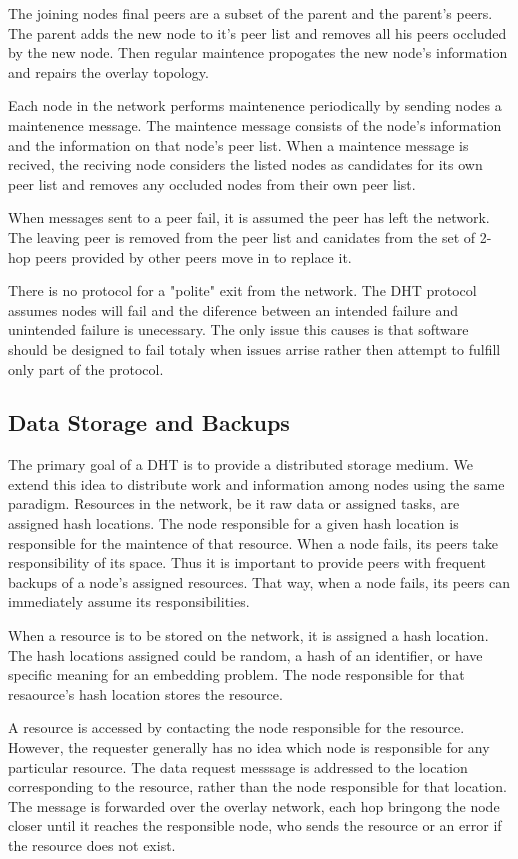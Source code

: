 \documentclass[11pt]{IEEEtran} %
\begin{document}
The joining nodes final peers are a subset of the parent and the parent's peers. The parent adds the new node to it's peer list and removes all his peers occluded by the new node.  Then regular maintence propogates the new node's information and repairs the overlay topology.

Each node in the network performs maintenence periodically by sending nodes a maintenence message. The maintence message consists of the node's information and the information on that node's peer list. When a maintence message is recived, the reciving node considers the listed nodes as candidates for its own peer list and removes any occluded nodes from their own peer list. 

When messages sent to a peer fail, it is assumed the peer has left the network. The leaving peer is removed from the peer list and canidates from the set of 2-hop peers provided by other peers move in to replace it.

There is no protocol for a "polite" exit from the network. The DHT protocol assumes nodes will fail and the diference between an intended failure and unintended failure is unecessary. The only issue this causes is that software should be designed to fail totaly when issues arrise rather then attempt to fulfill only part of the protocol.  

\subsection{Data Storage and Backups}
The primary goal of a DHT is to provide a distributed storage medium. We extend this idea  to distribute work and information among nodes using the same paradigm. Resources in the network, be it raw data or assigned tasks, are assigned hash locations. The node responsible for a given hash location is responsible for the maintence of that resource. When a node fails, its peers take responsibility of its space. Thus it is important to provide peers with frequent backups of a node's assigned resources.  That way, when a node fails, its peers can immediately assume its responsibilities.

When a resource is to be stored on the network, it is assigned a hash location. The hash locations assigned could be random, a hash of an identifier, or have specific meaning for an embedding problem. The node responsible for that resaource's hash location stores the resource.

A resource is accessed by contacting the node responsible for the resource.  However, the requester generally has no idea which node is responsible for any particular resource.  The data request messsage is addressed to the location corresponding to the resource, rather than the node responsible for that location.  The message is forwarded over the overlay network, each hop bringong the node closer until it reaches the responsible node, who sends the resource or an error if the resource does not exist.
\end{document}
